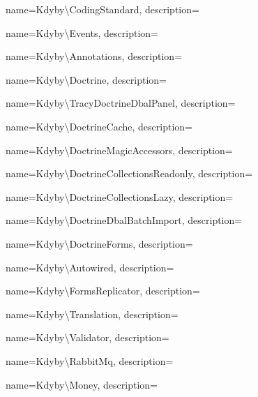  {
  name={K\-dy\-by\textbackslash{}\-Co\-din\-g\-S\-ta\-n\-da\-r\-d},
  description={} }

 {
  name={K\-dy\-by\textbackslash{}\-E\-ven\-ts},
  description={} }

 {
  name={K\-dy\-by\textbackslash{}\-Anno\-ta\-ti\-on\-s},
  description={} }

 {
  name={K\-dy\-by\textbackslash{}\-Doc\-tri\-ne},
  description={} }

 {
  name={K\-dy\-by\textbackslash{}\-Tra\-cy\-Doc\-tri\-ne\-D\-b\-a\-l\-Pa\-nel},
  description={} }

 {
  name={K\-dy\-by\textbackslash{}\-Doc\-tri\-ne\-Ca\-che},
  description={} }

 {
  name={K\-dy\-by\textbackslash{}\-Doc\-tri\-ne\-Ma\-gic\-Acces\-sor\-s},
  description={} }

 {
  name={K\-dy\-by\textbackslash{}\-Doc\-tri\-ne\-Collec\-ti\-ons\-Read\-on\-ly},
  description={} }

 {
  name={K\-dy\-by\textbackslash{}\-Doc\-tri\-ne\-Collec\-ti\-ons\-La\-zy},
  description={} }

 {
  name={K\-dy\-by\textbackslash{}\-Doc\-tri\-ne\-Dbal\-Batch\-Im\-port},
  description={} }

 {
  name={K\-dy\-by\textbackslash{}\-Doc\-tri\-ne\-Forms},
  description={} }

 {
  name={K\-dy\-by\textbackslash{}\-Auto\-wi\-red},
  description={} }

 {
  name={K\-dy\-by\textbackslash{}\-Forms\-Re\-pli\-ca\-tor},
  description={} }

 {
  name={K\-dy\-by\textbackslash{}\-Tran\-sla\-tion},
  description={} }

 {
  name={K\-dy\-by\textbackslash{}\-Va\-li\-da\-tor},
  description={} }

 {
  name={K\-dy\-by\textbackslash{}\-Ra\-bbit\-Mq},
  description={} }

 {
  name={K\-dy\-by\textbackslash{}\-Mo\-ney},
  description={} }

